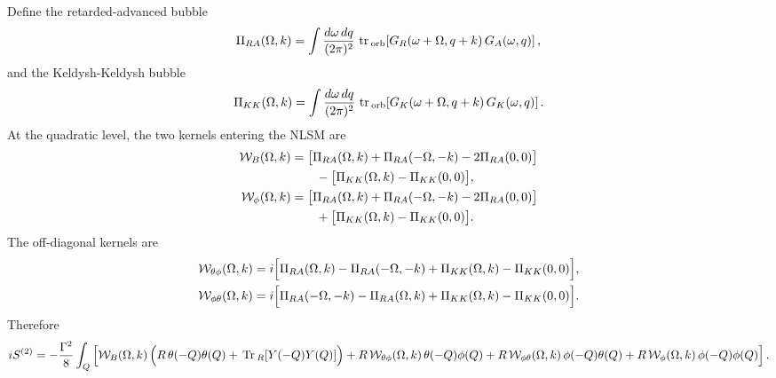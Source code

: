 \documentclass[aps,prx,preprint,amsmath,amssymb]{revtex4-2}
\newcommand{\Tr}{{\rm \, Tr\,}}
\newcommand{\tr}{{\rm \, tr\,}}
\begin{document}
Define the retarded-advanced bubble
\begin{equation}\label{eq:Pi-RA-def}
\Pi_{RA}(\Omega,k)
=
\int \frac{d\omega\,dq}{(2\pi)^2}\,
\tr_{\rm orb}\!\left[
G_R(\omega+\Omega,q+k)\,G_A(\omega,q)
\right],
\end{equation}
and the Keldysh-Keldysh bubble
\begin{equation}\label{eq:Pi-KK-def}
\Pi_{KK}(\Omega,k)
=
\int \frac{d\omega\,dq}{(2\pi)^2}\,
\tr_{\rm orb}\!\left[
G_K(\omega+\Omega,q+k)\,G_K(\omega,q)
\right].
\end{equation}
At the quadratic level, the two kernels entering the NLSM are
\begin{align}
\mathcal W_B(\Omega,k)
&=
\bigl[\Pi_{RA}(\Omega,k)+\Pi_{RA}(-\Omega,-k)-2\Pi_{RA}(0,0)\bigr]
\notag\\
&\qquad
-\bigl[\Pi_{KK}(\Omega,k)-\Pi_{KK}(0,0)\bigr],
\label{eq:WB-def}
\\
\mathcal W_\phi(\Omega,k)
&=
\bigl[\Pi_{RA}(\Omega,k)+\Pi_{RA}(-\Omega,-k)-2\Pi_{RA}(0,0)\bigr]
\notag\\
&\qquad
+\bigl[\Pi_{KK}(\Omega,k)-\Pi_{KK}(0,0)\bigr].
\label{eq:Wphi-def}
\end{align}
The off-diagonal kernels are
\begin{align}
\mathcal W_{\theta\phi}(\Omega,k)
&=
i\Bigl[
\Pi_{RA}(\Omega,k)-\Pi_{RA}(-\Omega,-k)
+\Pi_{KK}(\Omega,k)-\Pi_{KK}(0,0)
\Bigr],
\label{eq:Wthetaphi-def}
\\
\mathcal W_{\phi\theta}(\Omega,k)
&=
i\Bigl[
\Pi_{RA}(-\Omega,-k)-\Pi_{RA}(\Omega,k)
+\Pi_{KK}(\Omega,k)-\Pi_{KK}(0,0)
\Bigr].
\label{eq:Wphitheta-def}
\end{align}
Therefore
\begin{equation}\label{eq:nlsm-quadratic-final}
iS^{(2)}
=
-\frac{\Gamma^2}{8}\int_Q
\left[
\mathcal W_B(\Omega,k)\,
\Bigl(R\,\theta(-Q)\theta(Q)+\Tr_R[Y(-Q)Y(Q)]\Bigr)
+R\,\mathcal W_{\theta\phi}(\Omega,k)\,\theta(-Q)\phi(Q)
+R\,\mathcal W_{\phi\theta}(\Omega,k)\,\phi(-Q)\theta(Q)
+R\,\mathcal W_\phi(\Omega,k)\,\phi(-Q)\phi(Q)
\right].
\end{equation}
\end{document}
